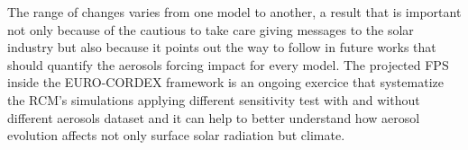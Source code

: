   The range of changes varies from one model to another, a result that is important not only because of the cautious to take care giving messages to the solar industry but also because it points out the way to follow in future works that should quantify the aerosols forcing impact for every model. The projected FPS inside the EURO-CORDEX framework is an ongoing exercice that systematize the RCM's simulations applying different sensitivity test with and without different aerosols dataset and it can help to better understand how aerosol evolution affects not only surface solar radiation but climate.

